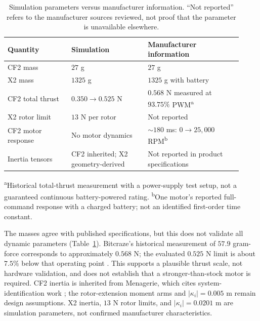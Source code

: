 \documentclass[letterpaper, 10 pt, conference]{ieeeconf}
\begin{document}
\begin{table}[!ht]
\centering
\caption{Simulation parameters versus manufacturer information.
``Not reported'' refers to the manufacturer sources reviewed, not proof
that the parameter is unavailable elsewhere.}
\label{tab:manufacturer}
\setlength{\tabcolsep}{3pt}
\footnotesize
\begin{tabular}{@{}>{\raggedright\arraybackslash}p{0.25\linewidth}>{\raggedright\arraybackslash}p{0.30\linewidth}>{\raggedright\arraybackslash}p{0.37\linewidth}@{}}
\toprule
Quantity & Simulation & Manufacturer information\\
\midrule
CF2 mass & $27$ g & $27$ g \cite{bitcrazeCF20Specs}\\
X2 mass & $1325$ g & $1325$ g with battery \cite{skydioX2ESpecs}\\
CF2 total thrust & $0.350\to0.525$ N & $0.568$ N measured at $93.75\%$ PWM\textsuperscript{a} \cite{bitcrazeThrustMeasurements}\\
X2 rotor limit & $13$ N per rotor & Not reported \cite{skydioX2ESpecs}\\
CF2 motor response & No motor dynamics & $\sim180$ ms: $0\to25{,}000$ RPM\textsuperscript{b} \cite{bitcrazeMotorResponse}\\
Inertia tensors & CF2 inherited; X2 geometry-derived & Not reported in product specifications \cite{bitcrazeCF20Specs,skydioX2ESpecs}\\
\bottomrule
\end{tabular}
\par\smallskip
\begin{minipage}{0.97\linewidth}
\scriptsize
\textsuperscript{a}Historical total-thrust measurement with a power-supply
test setup, not a guaranteed continuous battery-powered rating.
\textsuperscript{b}One motor's reported full-command response with a
charged battery; not an identified first-order time constant.
\end{minipage}
\end{table}

The masses agree with published specifications, but this does not
validate all dynamic parameters (Table~\ref{tab:manufacturer}). Bitcraze's
historical measurement of $57.9$ gram-force corresponds to approximately
$0.568$ N; the evaluated $0.525$ N limit is about $7.5\%$ below that
operating point \cite{bitcrazeThrustMeasurements}. This supports a plausible
thrust scale, not hardware validation, and does not establish that a
stronger-than-stock motor is required. CF2 inertia is inherited from
Menagerie, which cites system-identification work \cite{menagerieCF2}; the
rotor-extension moment arms and $|\kappa_i|=0.005$ m remain design
assumptions. X2 inertia, $13$ N rotor limits, and $|\kappa_i|=0.0201$ m are
simulation parameters, not confirmed manufacturer characteristics.
\end{document}
